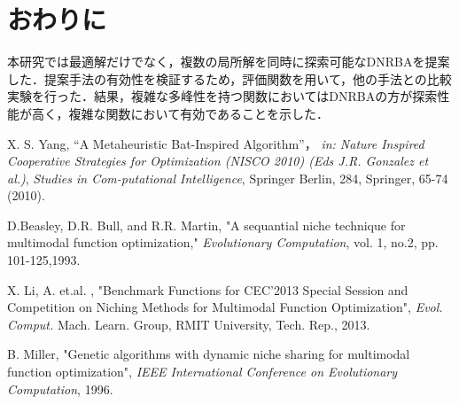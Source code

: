 \documentclass[twocolumn, a4paper]{UECIEresume}
\begin{document}
\section{おわりに}
本研究では最適解だけでなく，複数の局所解を同時に探索可能なDNRBAを提案した．提案手法の有効性を検証するため，評価関数を用いて，他の手法との比較実験を行った．結果，複雑な多峰性を持つ関数においてはDNRBAの方が探索性能が高く，複雑な関数において有効であることを示した．

{\small
\begin{thebibliography}{*}
 X. S. Yang, “A Metaheuristic Bat-Inspired Algorithm”， {\it in: Nature Inspired Cooperative Strategies for Optimization (NISCO 2010) (Eds J.R. Gonzalez et al.)}, {\it Studies in Com-putational Intelligence}, Springer Berlin, 284, Springer, 65-74 (2010).

 D.Beasley, D.R. Bull, and R.R. Martin, "A sequantial niche technique for multimodal function optimization," {\it Evolutionary Computation}, vol. 1, no.2, pp. 101-125,1993.

 X. Li, A. et.al. , "Benchmark Functions for CEC'2013 Special Session and Competition on Niching Methods for Multimodal Function Optimization", {\it Evol. Comput.} Mach. Learn. Group, RMIT University, Tech. Rep., 2013.


 B. Miller, "Genetic algorithms with dynamic niche sharing for multimodal function optimization", {\it IEEE International Conference on Evolutionary Computation}, 1996.
\end{thebibliography}
}
\end{document}
